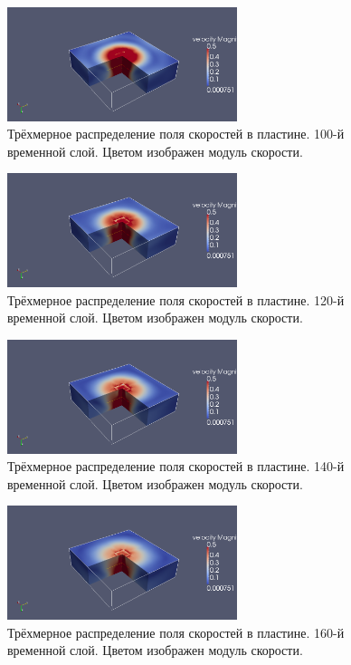 \begin{figure}[htp]
\centering
\includegraphics[width=0.6\textwidth]{png/strike-test/plate-3d-v/0100.png}
\caption{Трёхмерное распределение поля скоростей в пластине. 100-й временной слой. Цветом изображен модуль скорости.}
\end{figure}

\begin{figure}[htp]
\centering
\includegraphics[width=0.6\textwidth]{png/strike-test/plate-3d-v/0120.png}
\caption{Трёхмерное распределение поля скоростей в пластине. 120-й временной слой. Цветом изображен модуль скорости.}
\end{figure}

\begin{figure}[htp]
\centering
\includegraphics[width=0.6\textwidth]{png/strike-test/plate-3d-v/0140.png}
\caption{Трёхмерное распределение поля скоростей в пластине. 140-й временной слой. Цветом изображен модуль скорости.}
\end{figure}

\begin{figure}[htp]
\centering
\includegraphics[width=0.6\textwidth]{png/strike-test/plate-3d-v/0160.png}
\caption{Трёхмерное распределение поля скоростей в пластине. 160-й временной слой. Цветом изображен модуль скорости.}
\end{figure}

